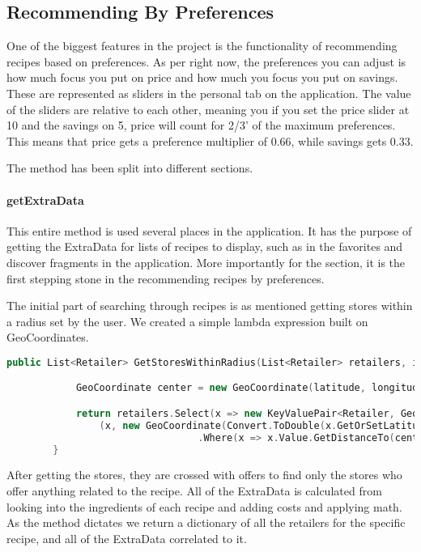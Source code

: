 \subsection{Recommending By Preferences}
\label{subsec:searchbypref}

One of the biggest features in the project is the functionality of recommending recipes based on preferences. As per right now, the preferences you can adjust is how much focus you put on price and how much you focus you put on savings. These are represented as sliders in the personal tab on the application. The value of the sliders are relative to each other, meaning you if you set the price slider at 10 and the savings on 5, price will count for 2/3' of the maximum preferences. This means that price gets a preference multiplier of 0.66, while savings gets 0.33.

The method has been split into different sections.

\paragraph{getExtraData} This entire method is used several places in the application. It has the purpose of getting the ExtraData for lists of recipes to display, such as in the favorites and discover fragments in the application. More importantly for the section, it is the first stepping stone in the recommending recipes by preferences.

The initial part of searching through recipes is as mentioned getting stores within a radius set by the user. We created a simple lambda expression built on GeoCoordinates.

\begin{lstlisting}[language=c++]
 public List<Retailer> GetStoresWithinRadius(List<Retailer> retailers, int radius, double latitude, double longitude) {

            GeoCoordinate center = new GeoCoordinate(latitude, longitude);

            return retailers.Select(x => new KeyValuePair<Retailer, GeoCoordinate>
				(x, new GeoCoordinate(Convert.ToDouble(x.GetOrSetLatitude), Convert.ToDouble(x.GetOrSetLongitude))))
                                 .Where(x => x.Value.GetDistanceTo(center) < radius).ToDictionary(x => x.Key, x => x.Value).Keys.ToList();
        }
\end{lstlisting}

After getting the stores, they are crossed with offers to find only the stores who offer anything related to the recipe. All of the ExtraData is calculated from looking into the ingredients of each recipe and adding costs and applying math. As the method dictates we return a dictionary of all the retailers for the specific recipe, and all of the ExtraData correlated to it.

